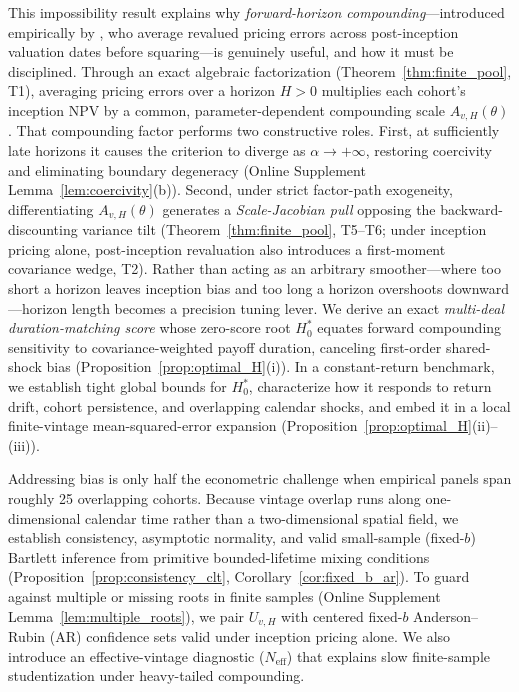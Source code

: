 \documentclass[12pt]{article}
\begin{document}
This impossibility result explains why \emph{forward-horizon compounding}---introduced empirically by \citet[eq.~4]{TP24}, who average revalued pricing errors across post-inception valuation dates before squaring---is genuinely useful, and how it must be disciplined.
Through an exact algebraic factorization (Theorem~\ref{thm:finite_pool}, T1), averaging pricing errors over a horizon $H > 0$ multiplies each cohort's inception NPV by a common, parameter-dependent compounding scale $A_{v,H}(\theta)$.
That compounding factor performs two constructive roles.
First, at sufficiently late horizons it causes the criterion to diverge as $\alpha \to +\infty$, restoring coercivity and eliminating boundary degeneracy (Online Supplement Lemma~\ref{lem:coercivity}(b)).
Second, under strict factor-path exogeneity, differentiating $A_{v,H}(\theta)$ generates a \emph{Scale-Jacobian pull} opposing the backward-discounting variance tilt (Theorem~\ref{thm:finite_pool}, T5--T6; under inception pricing alone, post-inception revaluation also introduces a first-moment covariance wedge, T2).
Rather than acting as an arbitrary smoother---where too short a horizon leaves inception bias and too long a horizon overshoots downward---horizon length becomes a precision tuning lever.
We derive an exact \emph{multi-deal duration-matching score} whose zero-score root $H_0^\ast$ equates forward compounding sensitivity to covariance-weighted payoff duration, canceling first-order shared-shock bias (Proposition~\ref{prop:optimal_H}(i)).
In a constant-return benchmark, we establish tight global bounds for $H_0^\ast$, characterize how it responds to return drift, cohort persistence, and overlapping calendar shocks, and embed it in a local finite-vintage mean-squared-error expansion (Proposition~\ref{prop:optimal_H}(ii)--(iii)).

Addressing bias is only half the econometric challenge when empirical panels span roughly 25 overlapping cohorts.
Because vintage overlap runs along one-dimensional calendar time rather than a two-dimensional spatial field, we establish consistency, asymptotic normality, and valid small-sample (fixed-$b$) Bartlett inference \citep{KV05,LLSW18} from primitive bounded-lifetime mixing conditions (Proposition~\ref{prop:consistency_clt}, Corollary~\ref{cor:fixed_b_ar}).
To guard against multiple or missing roots in finite samples (Online Supplement Lemma~\ref{lem:multiple_roots}), we pair $U_{v,H}$ with centered fixed-$b$ Anderson--Rubin (AR) confidence sets \citep{AR49,SW00} valid under inception pricing alone.
We also introduce an effective-vintage diagnostic ($N_{\mathrm{eff}}$) that explains slow finite-sample studentization under heavy-tailed compounding.
\end{document}
